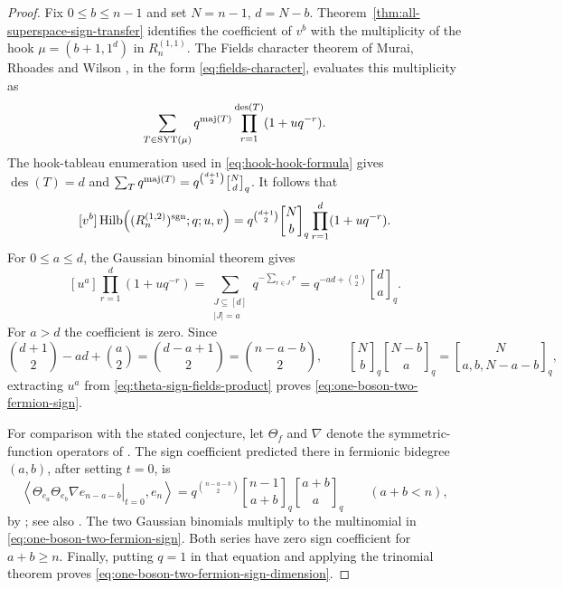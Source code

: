 \begin{proof}
Fix $0\leq b\leq n-1$ and set $N=n-1$, $d=N-b$.
Theorem~\ref{thm:all-superspace-sign-transfer} identifies the
coefficient of $v^b$ with the multiplicity of the hook
$\mu=(b+1,1^d)$ in $R_n^{(1,1)}$.
The Fields character theorem of Murai, Rhoades and Wilson
\cite[Theorem~5.2 and equation~(2.5)]{MRW}, in the form
\eqref{eq:fields-character}, evaluates this multiplicity as
\[
 \sum_{T\in\operatorname{SYT}(\mu)}q^{\operatorname{maj}(T)}
                  \prod_{r=1}^{\operatorname{des}(T)}(1+u q^{-r}).
\]
The hook-tableau enumeration used in \eqref{eq:hook-hook-formula}
gives $\operatorname{des}(T)=d$ and
$\sum_Tq^{\maj(T)}=q^{\binom{d+1}{2}}
 \genfrac{[}{]}{0pt}{}{N}{d}_q$.
It follows that
\begin{equation}\label{eq:theta-sign-fields-product}
 [v^b]\operatorname{Hilb}\!\left((R_n^{(1,2)})^{\sgn};q;u,v\right)
   =q^{\binom{d+1}{2}}\genfrac{[}{]}{0pt}{}{N}{b}_q
                \prod_{r=1}^{d}(1+u q^{-r}).
\end{equation}
For $0\leq a\leq d$, the Gaussian binomial theorem gives
\[
 [u^a]\prod_{r=1}^{d}(1+u q^{-r})
   =\sum_{\substack{J\subseteq[d]\\|J|=a}}q^{-\sum_{r\in J}r}
   =q^{-ad+\binom a2}\genfrac{[}{]}{0pt}{}{d}{a}_q.
\]
For $a>d$ the coefficient is zero.  Since
\[
 \binom{d+1}{2}-ad+\binom a2=\binom{d-a+1}{2}
      =\binom{n-a-b}{2},
 \qquad
 \genfrac{[}{]}{0pt}{}{N}{b}_q
 \genfrac{[}{]}{0pt}{}{N-b}{a}_q
     =\genfrac{[}{]}{0pt}{}{N}{a,b,N-a-b}_q,
\]
extracting $u^a$ from \eqref{eq:theta-sign-fields-product} proves
\eqref{eq:one-boson-two-fermion-sign}.

For comparison with the stated conjecture, let
$\Theta_f$ and $\nabla$ denote the symmetric-function operators
of \cite{DIV2021}.  The sign coefficient predicted there in
fermionic bidegree $(a,b)$, after setting $t=0$, is
\[
 \left\langle
     \left.\Theta_{e_a}\Theta_{e_b}\nabla e_{n-a-b}\right|_{t=0},
     e_n\right\rangle
   =q^{\binom{n-a-b}{2}}
      \genfrac{[}{]}{0pt}{}{n-1}{a+b}_q
      \genfrac{[}{]}{0pt}{}{a+b}{a}_q
 \qquad(a+b<n),
\]
by \cite[Theorem~5.6]{INV2024}; see also
\cite[Theorem~8.3]{Lentfer12}.  The two Gaussian binomials multiply
to the multinomial in \eqref{eq:one-boson-two-fermion-sign}.
Both series have zero sign coefficient for $a+b\geq n$.
Finally, putting $q=1$ in that equation and applying the
trinomial theorem proves
\eqref{eq:one-boson-two-fermion-sign-dimension}.
\end{proof}
